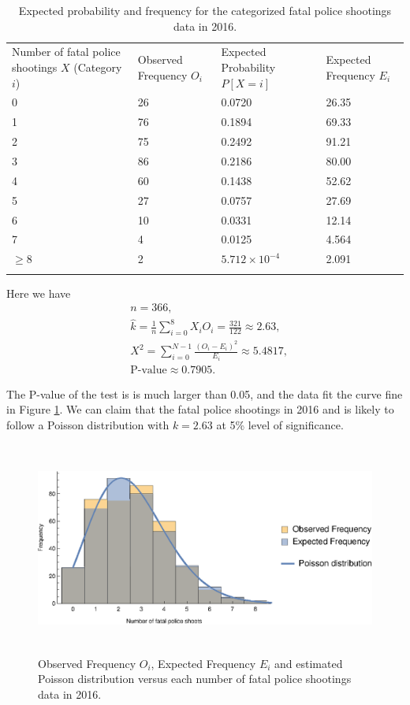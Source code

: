 \documentclass[conf]{new-aiaa}
\begin{document}
\begin{table}[!htbp]
\centering
\begin{tabular}{m{3cm}<{\centering}m{3cm}<{\centering}m{3cm}<{\centering}m{3cm}<{\centering}}
\toprule 
\toprule
Number of fatal police shootings $X$ (Category $i$)
 & Observed Frequency $O_i$ 
& Expected Probability $P[X=i]$ & Expected Frequency $E_i$ \\
\noalign{\smallskip}\hline\noalign{\smallskip}
0  &   26   & 0.0720  & 26.35\\
1  &   76   & 0.1894   & 69.33\\
2  &   75   & 0.2492   & 91.21\\
3  &   86   & 0.2186   & 80.00\\
4  &   60   & 0.1438   & 52.62\\
5  &   27   & 0.0757   & 27.69\\
6  &   10   & 0.0331   & 12.14\\
7  &   4    & 0.0125   & 4.564\\
$\geqslant$8  &   2    & $5.712\times10^{-4}$  & 2.091\\
\bottomrule 
\bottomrule  \smallskip
\end{tabular}
\caption{Expected probability and frequency for the categorized fatal police shootings data in 2016.}
\label{tab:q3-2016-exp}
\end{table}

Here we have
\begin{align*}
&n=366,\\
&\hat{k} = \frac{1}{n}\sum_{i=0}^{8} X_iO_i = \frac{321}{122} \approx 2.63,\\
&X^2=\sum_{i=0}^{N-1}\frac{(O_i-E_i)^2}{E_i}\approx5.4817,\\
&\text{P-value}\approx0.7905.
\end{align*}

The P-value of the test is is much larger than 0.05, and the data fit the curve fine in Figure \ref{fig:q3-2016-exp}. We can claim that the fatal police shootings in 2016 and is likely to follow a Poisson distribution with $k=2.63$ at 5\% level of significance.

\begin{figure}[!htbp]
\centering
\includegraphics[height=7cm]{q3/q3-2016-exp.eps}
\caption{Observed Frequency $O_i$, Expected Frequency $E_i$ and estimated Poisson distribution versus each number of fatal police shootings data in 2016.}
\label{fig:q3-2016-exp}
\end{figure}
\end{document}
